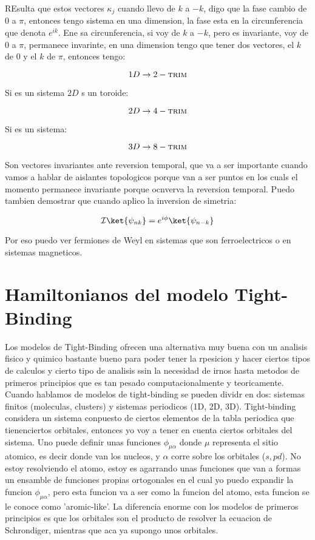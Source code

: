 \documentclass[11pt,fleqn]{book}
\begin{document}
REsulta que estos vectores $\kappa_{j}$ cuando llevo de $k$ a $-k$, digo que la fase cambio de $0$ a $\pi$, entonces tengo sistema en una dimension, la fase esta en la circunferencia que denota $e^{ik}$. Ene sa circunferencia, si voy de $k$ a $-k$, pero es invariante, voy de $0$ a $\pi$, permanece invarinte, en una dimension tengo que tener dos vectores, el $k$ de $0$ y el $k$ de $\pi$, entonces tengo:

$$1D\rightarrow2-\textsc{trim}$$

Si es un sistema $2D$ s un toroide:

$$2D\rightarrow4-\textsc{trim}$$

Si es un sistema:

$$3 D\rightarrow8-\textsc{trim}$$

Son vectores invariantes ante reversion temporal, que va a ser importante cuando vamos a hablar de aislantes topologicos porque van a ser puntos en los cuals el momento permanece invariante porque ocnverva la reversion temporal. Puedo tambien demostrar que cuando aplico la inversion de simetria:

\begin{equation}
    \mathcal{I}\ket{\psi_{nk}}=e^{i\phi}\ket{\psi_{n-k}}
\end{equation}

Por eso puedo ver fermiones de Weyl en sistemas que son ferroelectricos o en sistemas magneticos.


\section{Hamiltonianos del modelo Tight-Binding}

Los modelos de Tight-Binding ofrecen una alternativa muy buena con un analisis fisico y quimico bastante bueno para poder tener la rpesicion y hacer ciertos tipos de calculos y cierto tipo de analisis ssin la necesidad de irnos hasta metodos de primeros principios que es tan pesado computacionalmente y teoricamente. Cuando hablamos de modelos de tight-binding se pueden dividr en dos: sistemas finitos (moleculas, clusters) y sistemas periodicos (1D, 2D, 3D). Tight-binding considera un sistema conpuesto de ciertos elementos de la tabla periodica que tienenciertos orbitales, entonces yo voy a tener en cuenta ciertos orbitales del sistema. Uno puede definir unas funciones $\phi_{\mu\alpha}$ donde $\mu$ representa el sitio atomico, es decir donde van los nucleos, y $\alpha$ corre sobre los orbitales ($s,p d$). No estoy resolviendo el atomo, estoy es agarrando unas funciones que van a formas un ensamble de funciones propias ortogonales en el cual yo puedo expandir la funcion $\phi_{\mu\alpha}$, pero esta funcion va a ser como la funcion del atomo, esta funcion se le conoce como 'aromic-like'. La diferencia enorme con los modelos de primeros principios es que los orbitales son el producto de resolver la ecuacion de Schrondiger, mientras que aca ya supongo unos orbitales. 
\end{document}
